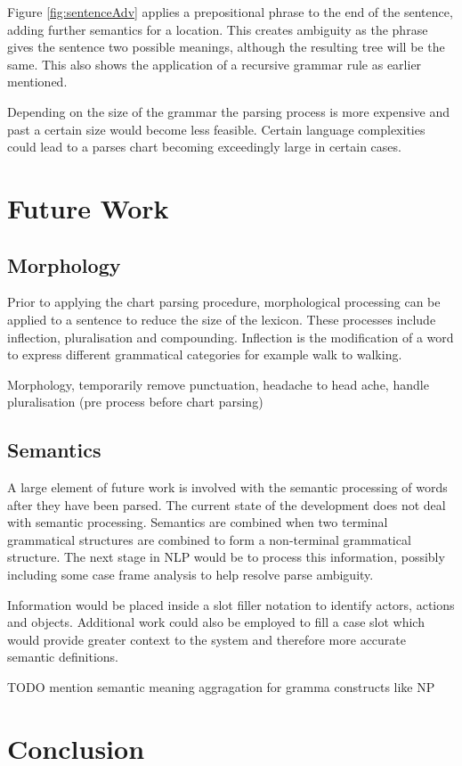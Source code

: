 \documentclass[11pt, a4paper]{article}
\begin{document}
Figure \ref{fig:sentenceAdv} applies a prepositional phrase to the end of the sentence, adding further semantics for a location. This creates ambiguity as the phrase gives the sentence two possible meanings, although the resulting tree will be the same. This also shows the application of a recursive grammar rule as earlier mentioned.

Depending on the size of the grammar the parsing process is more expensive and past a certain size would become less feasible. Certain language complexities could lead to a parses chart becoming exceedingly large in certain cases. 

\section{Future Work}\label{sec:future-work}

\subsection{Morphology}

Prior to applying the chart parsing procedure, morphological processing can be applied to a sentence  to reduce the size of the lexicon. These processes include inflection, pluralisation and compounding. Inflection is the modification of a word to express different grammatical categories for example walk to walking. 

Morphology, temporarily remove punctuation, headache to head ache, handle pluralisation (pre process before chart parsing)

\subsection{Semantics}

A large element of future work is involved with the semantic processing of words after they have been parsed. The current state of the development does not deal with semantic processing. Semantics are combined when two terminal grammatical structures are combined to form a non-terminal grammatical structure. The next stage in NLP would be to process this information, possibly including some case frame analysis to help resolve parse ambiguity.

Information would be placed inside a slot filler notation to identify actors, actions and objects. Additional work could also be employed to fill a case slot which would provide greater context to the system and therefore more accurate semantic definitions.

TODO mention semantic meaning aggragation for gramma constructs like NP

\section{Conclusion}\label{sec:conclusion}




\label{sec:bib}
\appendix
\end{document}
